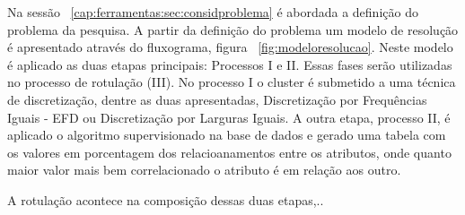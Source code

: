 Na sessão ~\ref{cap:ferramentas:sec:considproblema} é abordada a definição do problema da pesquisa. A partir da definição do problema um modelo de resolução é apresentado através do fluxograma, figura ~\ref{fig:modeloresolucao}. Neste modelo é aplicado as duas etapas principais: Processos I e II. Essas fases serão utilizadas no processo de rotulação (III). No processo I  o cluster é submetido a uma técnica de discretização, dentre as duas apresentadas, Discretização por Frequências Iguais - EFD ou Discretização por Larguras Iguais. A outra etapa, processo II, é aplicado o algoritmo supervisionado na base de dados e gerado uma tabela com os valores em porcentagem dos relacioanamentos entre os atributos, onde quanto maior valor mais bem correlacionado o atributo é em relação aos outro.

A rotulação acontece na composição dessas duas etapas,..





